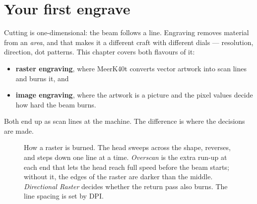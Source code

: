 \chapter{Your first engrave}
\label{ch:engrave}

Cutting is one-dimensional: the beam follows a line. Engraving removes material
from an \emph{area}, and that makes it a different craft with different dials ---
resolution, direction, dot patterns. This chapter covers both flavours of it:

\begin{itemize}
  \item \textbf{raster engraving}, where MeerK40t converts vector artwork into
        scan lines and burns it, and
  \item \textbf{image engraving}, where the artwork is a picture and the pixel
        values decide how hard the beam burns.
\end{itemize}

\noindent Both end up as scan lines at the machine. The difference is where the
decisions are made.

\begin{figure}[htbp]
\centering
{}
\caption{How a raster is burned. The head sweeps across the shape, reverses, and
steps down one line at a time. \emph{Overscan} is the extra run-up at each end
that lets the head reach full speed before the beam starts; without it, the edges
of the raster are darker than the middle. \emph{Directional Raster} decides
whether the return pass also burns. The line spacing is set by DPI.}
\label{fig:raster}
\end{figure}

